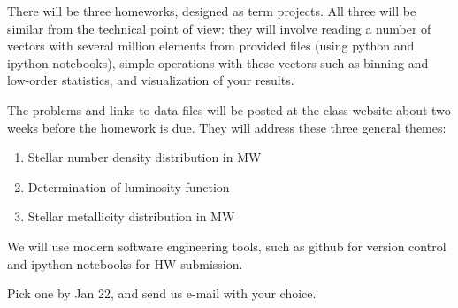 \documentclass[12pt]{article}
\begin{document}
\vskip 0.2in


There will be three homeworks, designed as term projects. All three will be similar
from the technical point of view: they will involve reading a number of vectors with several 
million elements from provided files (using python and ipython notebooks), simple operations 
with these vectors such as binning and low-order statistics, and visualization of your results. 

The problems and links to data files will be posted at the class website about two weeks 
before the homework is due. They will address these three general themes:

\begin{enumerate}
\item Stellar number density distribution in MW
\item Determination of luminosity function 
\item Stellar metallicity distribution in MW  
\end{enumerate}

We will use modern software engineering tools, such as github for version control and ipython 
notebooks for HW submission. 

\vskip 0.2in

 Pick one by Jan 22, and send
us e-mail with your choice.
\end{document}
